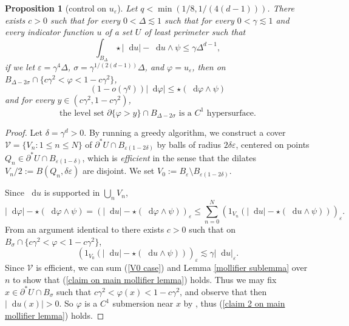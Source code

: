 \documentclass[reqno,12pt,letterpaper]{amsart}
\newcommand*\dif{\mathop{}\!\mathrm{d}}
\newcommand{\dfn}[1]{\emph{#1}\index{#1}}
\newtheorem{proposition}[theorem]{Proposition}
\theoremstyle{definition}
\numberwithin{equation}{section}
\begin{document}
\begin{proposition}[control on $u_\varepsilon$]\label{main mollifier lemma}
Let $q < \min(1/8, 1/(4(d - 1)))$. There exists $c > 0$ such that for every $0 < \Delta \lesssim 1$ such that for every $0 < \gamma \lesssim 1$ and every indicator function $u$ of a set $U$ of least perimeter such that
\begin{equation}\label{hypothesis on main mollifier lemma}
\int_{B_\Delta} \star |\dif u| - \dif u \wedge \psi \leq \gamma \Delta^{d - 1},
\end{equation}
if we let $\varepsilon = \gamma^4\Delta$, $\sigma = \gamma^{1/(2(d - 1))}\Delta$, and $\varphi = u_\varepsilon$, then on $B_{\Delta - 2\sigma} \cap \{c\gamma^2 < \varphi < 1 - c\gamma^2\}$,
\begin{equation}\label{claim on main mollifier lemma}
(1 - o(\gamma^q)) |\dif \varphi| \leq \star(\dif \varphi \wedge \psi)
\end{equation}
and for every $y \in (c\gamma^2, 1 - c\gamma^2)$,
\begin{equation}\label{claim 2 on main mollifier lemma}
\text{the level set } \partial \{\varphi > y\} \cap B_{\Delta - 2\sigma} \text{ is a }C^1\text{ hypersurface}.
\end{equation}
\end{proposition}
\begin{proof}
Let $\delta = \gamma^d > 0$.
By running a greedy algorithm, we construct a cover $\mathcal V = \{V_n: 1 \leq n \leq N\}$ of $\partial^* U \cap B_{\varepsilon(1 - 2\delta)}$ by balls of radius $2\delta\varepsilon$, centered on points $Q_n \in \partial^* U \cap B_{\varepsilon(1 - \delta)}$, which is \dfn{efficient} in the sense that the dilates $V_n/2 := B(Q_n, \delta\varepsilon)$ are disjoint.
We set $V_0 := B_\varepsilon \setminus B_{\varepsilon(1 - 2\delta)}$.

Since $\dif u$ is supported in $\bigcup_n V_n$,
$$|\dif \varphi| - \star(\dif \varphi \wedge \psi) = (|\dif u| - \star(\dif \varphi \wedge \psi))_\varepsilon \leq \sum_{n=0}^N (1_{V_n}(|\dif u| - \star(\dif u \wedge \psi)))_\varepsilon.$$
From an argument identical to \cite[pg92]{Giusti77} there exists $c > 0$ such that on $B_\sigma \cap \{c\gamma^2 < \varphi < 1 - c\gamma^2\}$,
\begin{equation}\label{V0 case}
(1_{V_0}(|\dif u| - \star(\dif u \wedge \psi)))_\varepsilon \lesssim \gamma |\dif u|_\varepsilon.
\end{equation}
Since $\mathcal V$ is efficient, we can sum (\ref{V0 case}) and Lemma \ref{mollifier sublemma} over $n$ to show that (\ref{claim on main mollifier lemma}) holds.
Thus we may fix $x \in \partial^* U \cap B_\sigma$ such that $c\gamma^2 < \varphi(x) < 1 - c\gamma^2$, and observe that then $|\dif u(x)| > 0$.
So $\varphi$ is a $C^1$ submersion near $x$ by \cite[Lemma 7.1]{Giusti77}, thus (\ref{claim 2 on main mollifier lemma}) holds.
\end{proof}
\end{document}
